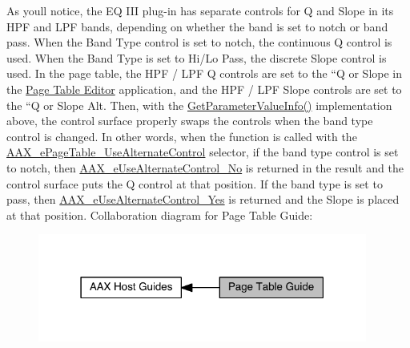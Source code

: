 As you\textquotesingle{}ll notice, the E\+Q I\+I\+I plug-\/in has separate controls for Q and Slope in its H\+P\+F and L\+P\+F bands, depending on whether the band is set to notch or band pass. When the Band Type control is set to notch, the continuous Q control is used. When the Band Type is set to Hi/\+Lo Pass, the discrete Slope control is used. In the page table, the H\+P\+F / L\+P\+F Q controls are set to the ``\+Q or Slope\textquotesingle{}\textquotesingle{} in the \hyperlink{a00363_subsection_creating_page_tables_in_pete}{Page Table Editor} application, and the H\+P\+F / L\+P\+F Slope controls are set to the ``\+Q or Slope Alt\textquotesingle{}\textquotesingle{}. Then, with the \hyperlink{a00018_a8f0a38e7445a97282ea3a295979bbbea}{Get\+Parameter\+Value\+Info()} implementation above, the control surface properly swaps the controls when the band type control is changed. In other words, when the function is called with the \hyperlink{a00206_aa169208a2ce713fa021e20deb2eaf608a1a0d975a333d3aee81b22f878697e9c4}{A\+A\+X\+\_\+e\+Page\+Table\+\_\+\+Use\+Alternate\+Control} selector, if the band type control is set to notch, then \hyperlink{a00206_abbcc8b4e8207262a5dd9e32047a51a29a5cfea068cc7ea51becccc9d26955e443}{A\+A\+X\+\_\+e\+Use\+Alternate\+Control\+\_\+\+No} is returned in the result and the control surface puts the Q control at that position. If the band type is set to pass, then \hyperlink{a00206_abbcc8b4e8207262a5dd9e32047a51a29aa63097dc0b27e51411f30b06b2db26f1}{A\+A\+X\+\_\+e\+Use\+Alternate\+Control\+\_\+\+Yes} is returned and the Slope is placed at that position.  Collaboration diagram for Page Table Guide\+:
\nopagebreak
\begin{figure}[H]
\begin{center}
\leavevmode
\includegraphics[width=307pt]{a00363}
\end{center}
\end{figure}
